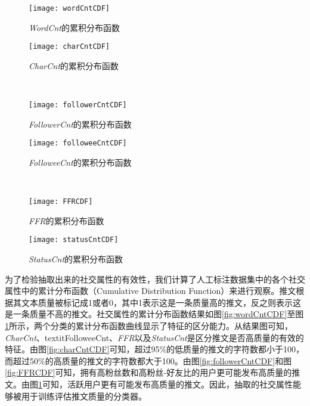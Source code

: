 \begin{figure}[!htbp]
   \begin{minipage}{0.48\textwidth}
     \centering
     \texttt{[image: wordCntCDF]}
     \caption{\textit{WordCnt}的累积分布函数}
     \label{fig:wordCntCDF}
   \end{minipage}
   \hfill
   \begin {minipage}{0.48\textwidth}
     \centering
     \texttt{[image: charCntCDF]}
     \caption{\textit{CharCnt}的累积分布函数}
     \label{fig:charCntCDF}
   \end{minipage}
   \\
   \begin{minipage}{0.48\textwidth}
     \centering
     \texttt{[image: followerCntCDF]}
     \caption{\textit{FollowerCnt}的累积分布函数}
     \label{fig:followerCntCDF}
   \end{minipage}
   \hfill
   \begin {minipage}{0.48\textwidth}
     \centering
     \texttt{[image: followeeCntCDF]}
     \caption{\textit{FolloweeCnt}的累积分布函数}
     \label{fig:followeeCntCDF}
   \end{minipage}
   \\
   \begin{minipage}{0.48\textwidth}
     \centering
     \texttt{[image: FFRCDF]}
     \caption{\textit{FFR}的累积分布函数}
     \label{fig:FFRCDF}
   \end{minipage}
   \hfill
   \begin {minipage}{0.48\textwidth}
     \centering
     \texttt{[image: statusCntCDF]}
     \caption{\textit{StatusCnt}的累积分布函数}
     \label{fig:StatusCnt}
   \end{minipage}
\end{figure}

为了检验抽取出来的社交属性的有效性，我们计算了人工标注数据集中的各个社交属性中的累计分布函数（Cumulative Distribution Function）来进行观察。推文根据其文本质量被标记成1或者0，其中1表示这是一条质量高的推文，反之则表示这是一条质量不高的推文。社交属性的累计分布函数结果如图\ref{fig:wordCntCDF}至图\ref{fig:StatusCnt}所示，两个分类的累计分布函数曲线显示了特征的区分能力。从结果图可知，\textit{CharCnt}、textit{FolloweeCnt}、\textit{FFR}以及\textit{StatusCnt}是区分推文是否高质量的有效的特征。由图\ref{fig:charCntCDF}可知，超过95\%的低质量的推文的字符数都小于100，而超过50\%的高质量的推文的字符数都大于100。由图\ref{fig:followerCntCDF}和图\ref{fig:FFRCDF}可知，拥有高粉丝数和高粉丝-好友比的用户更可能发布高质量的推文。由图\ref{fig:StatusCnt}可知，活跃用户更有可能发布高质量的推文。因此，抽取的社交属性能够被用于训练评估推文质量的分类器。

